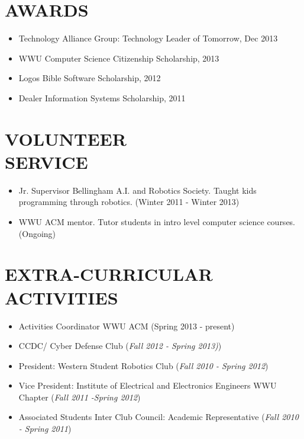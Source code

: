 \documentclass[line,margin]{res}
\begin{document}
\begin{resume}
\section{AWARDS}
	\begin{itemize} \itemsep -1pt
		\item Technology Alliance Group: Technology Leader of Tomorrow, Dec 2013
		\item WWU Computer Science Citizenship Scholarship, 2013
		\item Logos Bible Software Scholarship, 2012
		\item Dealer Information Systems Scholarship, 2011
	\end{itemize}
 
\section{VOLUNTEER \\ SERVICE}
		\begin{itemize} \itemsep -1pt
			\item Jr. Supervisor Bellingham A.I. and Robotics Society.  Taught kids programming through robotics. (Winter 2011 - Winter 2013)
			\item WWU ACM mentor.  Tutor students in intro level computer science courses.  (Ongoing)
		\end{itemize}

\section{EXTRA-CURRICULAR \\ ACTIVITIES} 
	\begin{itemize} \itemsep -1pt
	\item Activities Coordinator WWU ACM (Spring 2013 - present)
	\item CCDC/ Cyber Defense Club ({\sl Fall 2012 - Spring 2013)})
	\item President: Western Student Robotics Club ({\sl Fall 2010 - Spring 2012})
 	\item Vice President: Institute of Electrical and Electronics Engineers WWU Chapter ({\sl Fall 2011 -Spring 2012})
	\item Associated Students Inter Club Council: Academic Representative ({\sl Fall 2010 - Spring 2011})
	\end{itemize}
\end{resume}
\end{document}
